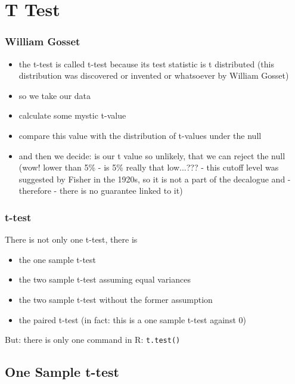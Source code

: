 \documentclass[xcolor={table}]{beamer}
\begin{document}
\section{T Test}

\begin{frame}\frametitle{William Gosset}
  \begin{itemize}
  \item the t-test is called t-test because its test statistic is t distributed (this distribution was discovered or invented or whatsoever by William Gosset)
  \item so we take our data 
  \item calculate some mystic t-value
  \item compare this value with the distribution of t-values under the null
  \item and then we decide: is our t value so unlikely, that we can reject the null (wow! lower than 5\% - is 5\% really that low...??? - this cutoff level was suggested by Fisher in the 1920s, so it is not a part of the decalogue and - therefore - there is no guarantee linked to it)
  \end{itemize}
\end{frame}


\begin{frame}\frametitle{t-test}
There is not only one t-test, there is 
  \begin{itemize}
  \item the one sample t-test
  \item the two sample t-test assuming equal variances
  \item the two sample t-test without the former assumption
  \item the paired t-test (in fact: this is a one sample t-test against 0)
  \end{itemize}
But: there is only one command in R: \texttt{t.test()}
\end{frame}

\subsection{One Sample t-test}

\end{document}
